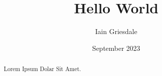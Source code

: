 \documentclass[titlepage]{article}
\title{Hello World}
\author{Iain Griesdale}
\date{September 2023}
\begin{document}
\maketitle

\begin{abstract}
    Lorem Ipsum Dolar Sit Amet.
\end{abstract}
\end{document}
